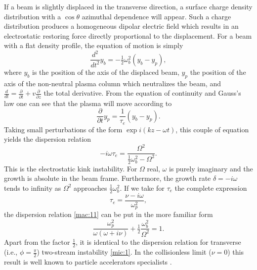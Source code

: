 \documentclass [12pt,a4paper,     ]{report} %
\newcommand{\Oh}{\tfrac{1}{2}}        %
\begin{document}
	If a beam is slightly displaced in the transverse direction, a surface charge density distribution with a $\cos \theta$ azimuthal dependence will appear.  Such a charge distribution produces a homogeneous dipolar electric field which results in an electrostatic restoring force directly proportional to the displacement.  For a beam with a flat density profile, the equation of motion is simply \cite{LINHA1959-}
%
\begin{equation}\label{mac:9} %
   \frac{d^2}{dt^2} y_b = -\Oh \omega_b^2 (y_b - y_p),
\end{equation}
%
where $y_b$ is the position of the axis of the displaced beam, $y_p$ the position of the axis of the non-neutral plasma column which neutralizes the beam, and $\frac{d}{dt} = \frac{\partial}{\partial t} +v \frac{\partial}{\partial z}$  the total derivative.  From the equation of continuity and Gauss's law one can see that the plasma will move according to
%
\begin{equation}\label{mac:10} %
    \frac{\partial}{\partial t} y_p = \frac{1}{\tau_e} (y_b - y_p).
\end{equation}
%
Taking small perturbations of the form  $\exp i(kz-\omega t)$, this couple of equation yields the dispersion relation
%
\begin{equation}\label{mac:11} %
    -i\omega \tau_e = \frac{\Omega^2}{\Oh \omega_b^2- \Omega^2}.
\end{equation}
%
This is the electrostatic kink instability.  For $\Omega$ real, $\omega$ is purely imaginary and the growth is absolute in the beam frame.  Furthermore, the growth rate $\delta = -i\omega$ tends to infinity as $\Omega^2$ approaches $\Oh \omega_b^2$.  If we take for $\tau_e$ the complete expression
%
\begin{equation}\label{mac:12} %
     \tau_e = \frac{\nu - i\omega}{\omega_p^2},
\end{equation}
%
the dispersion relation \eqref{mac:11} can be put in the more familiar form \cite{KINO-1963-}
%
\begin{equation}\label{mac:13} %
           \frac{\omega_p^2}{\omega(\omega+i\nu)}
     + \Oh \frac{\omega_b^2}{\Omega^2}  = 1.
\end{equation}
%
Apart from the factor $\Oh$, it is identical to the dispersion relation for transverse (i.e., $\phi=\frac{\pi}{2}$) two-stream instability \eqref{mic:1}.  In the collisionless limit ($\nu=0$)  this result is well known to particle accelerators specialists \cite{BUDKE1956A}.
\end{document}
